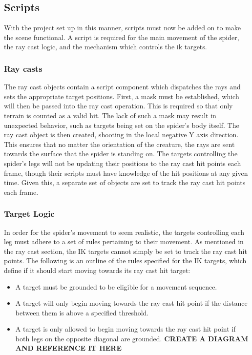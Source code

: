 \subsection{Scripts}
With the project set up in this manner, scripts must now be added on to make the
scene functional. A script is required for the main movement of the spider, the
ray cast logic, and the mechanism which controls the ik targets.

\subsubsection{Ray casts}
The ray cast objects contain a script component which dispatches the rays and
sets the appropriate target positions. First, a mask must be established, which
will then be passed into the ray cast operation. This is required so that only
terrain is counted as a valid hit. The lack of such a mask may result in
unexpected behavior, such as targets being set on the spider's body itself. The
ray cast object is then created, shooting in the local negative Y axis
direction. This ensures that no matter the orientation of the creature, the rays
are sent towards the surface that the spider is standing on. The targets
controlling the spider's legs will not be updating their positions to the
ray cast hit points each frame, though their scripts must have knowledge of the
hit positions at any given time. Given this, a separate set of objects are set
to track the ray cast hit points each frame.

\subsubsection{Target Logic}
In order for the spider's movement to seem realistic, the targets controlling
each leg must adhere to a set of rules pertaining to their movement. As
mentioned in the ray cast section, the IK targets cannot simply be set to track
the ray cast hit points. The following is an outline of the rules specified for
the IK targets, which define if it should start moving towards its ray cast hit
target:
\begin{itemize}
    \item A target must be grounded to be eligible for a movement sequence.

    \item A target will only begin moving towards the ray cast hit point if the
        distance between them is above a specified threshold.

    \item A target is only allowed to begin moving towards the ray cast hit
        point if both legs on the opposite diagonal are grounded.
        \textbf{CREATE A DIAGRAM AND REFERENCE IT HERE}
\end{itemize}

